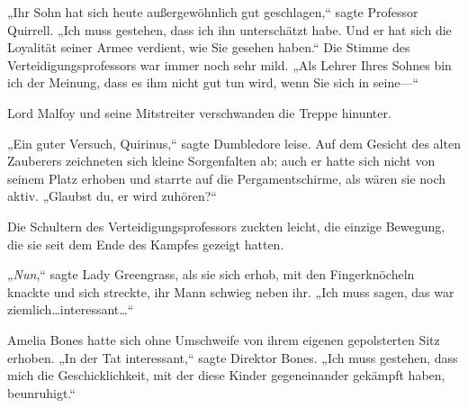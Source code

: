 „Ihr Sohn hat sich heute außergewöhnlich gut geschlagen,“ sagte Professor Quirrell. „Ich muss gestehen, dass ich ihn unterschätzt habe. Und er hat sich die Loyalität seiner Armee verdient, wie Sie gesehen haben.“ Die Stimme des Verteidigungsprofessors war immer noch sehr mild. „Als Lehrer Ihres Sohnes bin ich der Meinung, dass es ihm nicht gut tun wird, wenn Sie sich in seine—“

Lord Malfoy und seine Mitstreiter verschwanden die Treppe hinunter.

„Ein guter Versuch, Quirinus,“ sagte Dumbledore leise. Auf dem Gesicht des alten Zauberers zeichneten sich kleine Sorgenfalten ab; auch er hatte sich nicht von seinem Platz erhoben und starrte auf die Pergamentschirme, als wären sie noch aktiv. „Glaubst du, er wird zuhören?“

Die Schultern des Verteidigungsprofessors zuckten leicht, die einzige Bewegung, die sie seit dem Ende des Kampfes gezeigt hatten.

„\emph{Nun},“ sagte Lady Greengrass, als sie sich erhob, mit den Fingerknöcheln knackte und sich streckte, ihr Mann schwieg neben ihr. „Ich muss sagen, das war ziemlich…interessant…“

Amelia Bones hatte sich ohne Umschweife von ihrem eigenen gepolsterten Sitz erhoben. „In der Tat interessant,“ sagte Direktor Bones. „Ich muss gestehen, dass mich die Geschicklichkeit, mit der diese Kinder gegeneinander gekämpft haben, beunruhigt.“

